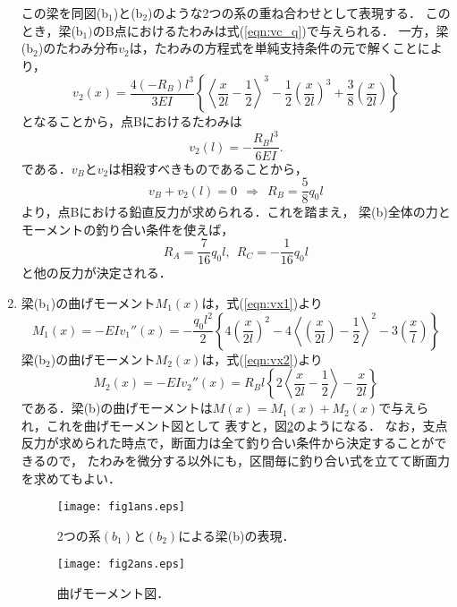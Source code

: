 \documentclass[10pt,a4j]{jarticle}
\begin{document}
\begin{enumerate}
この梁を同図(b$_1$)と(b$_2$)のような2つの系の重ね合わせとして表現する．
このとき，梁(b$_1)$のB点におけるたわみは式(\ref{eqn:vc_q})で与えられる．
一方，梁(b$_2$)のたわみ分布$v_2$は，たわみの方程式を単純支持条件の元で解くことにより，
\begin{equation}
	v_2(x)=\frac{4(-R_B)l^3}{3EI}\left\{
		\left< \frac{x}{2l}-\frac{1}{2}\right>^3
		-
		\frac{1}{2}
		\left(\frac{x}{2l} \right)^3
		+
		\frac{3}{8}
		\left(\frac{x}{2l} \right)
	\right\}
	\label{eqn:vx2}
\end{equation}
となることから，点Bにおけるたわみは
\begin{equation}
	v_2\left( l \right) 
	= -\frac{R_Bl^3}{6EI}.
	\label{eqn:vc_P}
\end{equation}
である．$v_B$と$v_2$は相殺すべきものであることから，
\begin{equation}
	v_B+v_2(l)=0 \ \ \Rightarrow \ \ R_B=\frac{5}{8}q_0l
\end{equation}
より，点Bにおける鉛直反力が求められる．これを踏まえ，
梁(b)全体の力とモーメントの釣り合い条件を使えば，
\begin{equation}
	R_A=\frac{7}{16}q_0l, \ \ R_C=-\frac{1}{16}q_0l
\end{equation}
と他の反力が決定される．
\item
梁(b$_1$)の曲げモーメント$M_1(x)$は，式(\ref{eqn:vx1})より
\begin{equation}
	M_1(x)=-EIv_1''(x)=
	-\frac{q_0l^2}{2}		
	\left\{
		4 \left( \frac{x}{2l} \right)^2
		-
		4
		\left< \left(\frac{x}{2l}\right)-\frac{1}{2} \right>^2
		-
		3
		\left(\frac{x}{l} \right)
	\right\}
	\label{eqn:Mx}
\end{equation}
梁(b$_2$)の曲げモーメント$M_2(x)$は，式(\ref{eqn:vx2})より
\begin{equation}
	M_2(x)=-EIv_2''(x)=
	R_Bl		
	\left\{
		2\left< \frac{x}{2l} -\frac{1}{2}\right>
		-
		\frac{x}{2l}
	\right\}
	\label{eqn:Mx2}
\end{equation}
である．梁(b)の曲げモーメントは$M(x)=M_1(x)+M_2(x)$で与えられ，これを曲げモーメント図として
表すと，図\ref{fig:fig2}のようになる．
なお，支点反力が求められた時点で，断面力は全て釣り合い条件から決定することができるので，
たわみを微分する以外にも，区間毎に釣り合い式を立てて断面力を求めてもよい．
\begin{figure}[h]
	\begin{center}
	\texttt{[image: fig1ans.eps]} 
	\end{center}
	\caption{2つの系$(b_1)$と$(b_2)$による梁(b)の表現．}
	\label{fig:fig1}
\end{figure}
\begin{figure}[h]
	\begin{center}
	\texttt{[image: fig2ans.eps]} 
	\end{center}
	\caption{曲げモーメント図．}
	\label{fig:fig2}
\end{figure}
\end{enumerate}
\end{document}
